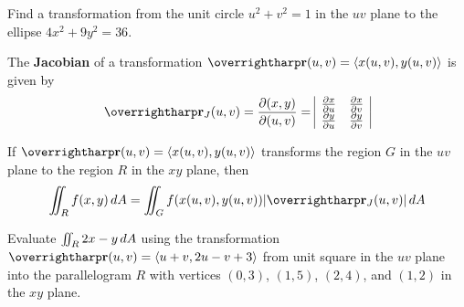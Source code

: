 \documentclass[letterpaper, twoside, 12pt]{book}
\begin{document}
          \begin{problem}
            Find a transformation from the unit circle $u^2+v^2 = 1$ in
            the $uv$ plane to the ellipse $4x^2+9y^2=36$.
          \end{problem}

          \begin{solution}

          \end{solution}

          \begin{contributors}

          \end{contributors}

\begin{definition}
  The \textbf{Jacobian} of a transformation $\vect{r}(u,v)=\<x(u,v),y(u,v)\>$
  is given by
    \[
    \vect{r}_J(u,v) = \frac{\p (x,y)}{\p (u,v)} =
    \begin{array}{|c c|}
    \frac{\p x}{\p u} & \frac{\p x}{\p v} \\
    \frac{\p y}{\p u} & \frac{\p y}{\p v} \\
    \end{array}
    \]
\end{definition}

\begin{theorem}
  If $\vect{r}(u,v)=\<x(u,v),y(u,v)\>$ transforms the region
  $G$ in the $uv$ plane to the region $R$ in the $xy$ plane, then
    \[
      \iint_R f(x,y) \dvar{A}
        =
      \iint_G f(x(u,v),y(u,v)) |\vect{r}_J(u,v)|\dvar{A}
    \]
\end{theorem}

          \begin{problem}
            Evaluate $\iint_R 2x-y\,d{A}$ using the transformation
            $\vect{r}(u,v)=\<u+v,2u-v+3\>$ from unit square in the $uv$ plane
            into the parallelogram $R$ with vertices $(0,3)$, $(1,5)$,
            $(2,4)$, and $(1,2)$ in the $xy$ plane.
          \end{problem}

          \begin{solution}

          \end{solution}

          \begin{contributors}

          \end{contributors}
\end{document}
